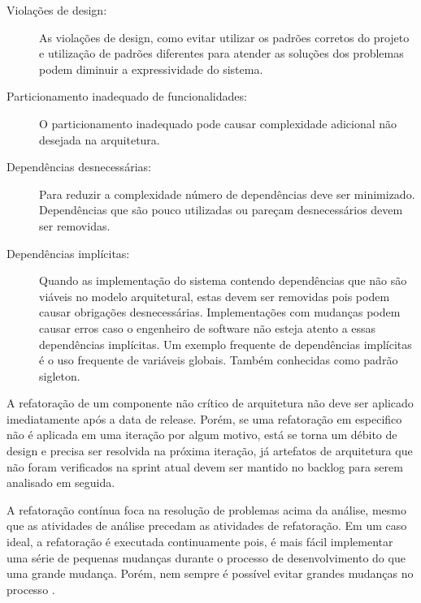 \begin{description}
\item[Violações de design:]
As violações de design, como evitar utilizar os padrões corretos do projeto e utilização de padrões diferentes para atender as soluções dos problemas podem diminuir a expressividade do sistema.

\item[Particionamento inadequado de funcionalidades:]
O particionamento inadequado pode causar complexidade adicional não desejada na arquitetura.

\item[Dependências desnecessárias:]
Para reduzir a complexidade número de dependências deve ser minimizado. Dependências que são pouco utilizadas ou pareçam desnecessários devem ser removidas.

\item[Dependências implícitas:]
Quando as implementação do sistema contendo dependências que não são viáveis no modelo arquitetural, estas devem ser removidas pois podem causar obrigações desnecessárias. Implementações com mudanças podem causar erros caso o engenheiro de software não esteja atento a essas dependências implícitas. Um exemplo frequente de dependências implícitas é o uso frequente de variáveis globais. Também conhecidas como padrão sigleton.

\end{description}

A refatoração de um componente não crítico de arquitetura não deve ser aplicado imediatamente após a data de release. Porém, se uma refatoração em especifico não é aplicada em uma iteração por algum motivo, está se torna um débito de design e precisa ser resolvida na próxima iteração, já artefatos de arquitetura que não foram verificados na sprint atual devem ser mantido no backlog para serem analisado em seguida.

A refatoração contínua \cite{beck2000extreme} foca na resolução de problemas acima da análise, mesmo que as atividades de análise precedam as atividades de refatoração. Em um caso ideal, a refatoração é executada continuamente \cite{stamelos2007agile} pois, é mais fácil implementar uma série de pequenas mudanças durante o processo de desenvolvimento do que uma grande mudança. Porém, nem sempre é possível evitar grandes mudanças no processo \cite{lippert2006refactoring}. 


